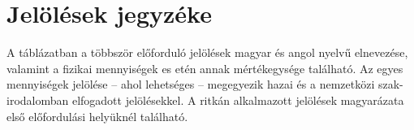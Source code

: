 \documentclass[12pt,a4paper]{article}
\begin{document}
\thispagestyle{plain}
\section*{Jelölések jegyzéke}

A táblázatban a többször előforduló jelölések magyar és angol nyelvű elnevezése, valamint a fizikai mennyiségek es etén annak mértékegysége található. Az egyes mennyiségek jelölése – ahol lehetséges – megegyezik hazai és a nemzetközi szak-irodalomban elfogadott jelölésekkel. A ritkán alkalmazott jelölések magyarázata első előfordulási helyüknél található.
\newpage

\thispagestyle{fancy}

\thispagestyle{fancy}

\newpage

%

    \thispagestyle{fancy}
    
    
    
    
    
    
    
    
    
    
    \newpage


% 


% 
% 

\newpage
\end{document}
